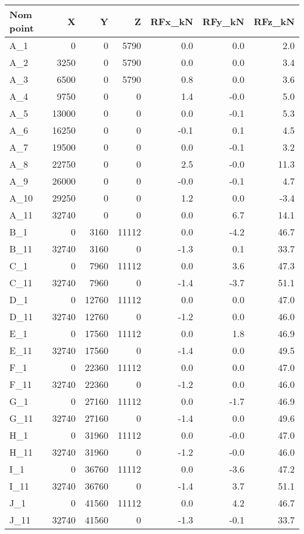 \begin{tabular}{lrrrrrr}
\toprule
Nom point & X & Y & Z & RFx\_kN & RFy\_kN & RFz\_kN \\
\midrule
A\_1 & 0 & 0 & 5790 & 0.0 & 0.0 & 2.0 \\
A\_2 & 3250 & 0 & 5790 & 0.0 & 0.0 & 3.4 \\
A\_3 & 6500 & 0 & 5790 & 0.8 & 0.0 & 3.6 \\
A\_4 & 9750 & 0 & 0 & 1.4 & -0.0 & 5.0 \\
A\_5 & 13000 & 0 & 0 & 0.0 & -0.1 & 5.3 \\
A\_6 & 16250 & 0 & 0 & -0.1 & 0.1 & 4.5 \\
A\_7 & 19500 & 0 & 0 & 0.0 & -0.1 & 3.2 \\
A\_8 & 22750 & 0 & 0 & 2.5 & -0.0 & 11.3 \\
A\_9 & 26000 & 0 & 0 & -0.0 & -0.1 & 4.7 \\
A\_10 & 29250 & 0 & 0 & 1.2 & 0.0 & -3.4 \\
A\_11 & 32740 & 0 & 0 & 0.0 & 6.7 & 14.1 \\
B\_1 & 0 & 3160 & 11112 & 0.0 & -4.2 & 46.7 \\
B\_11 & 32740 & 3160 & 0 & -1.3 & 0.1 & 33.7 \\
C\_1 & 0 & 7960 & 11112 & 0.0 & 3.6 & 47.3 \\
C\_11 & 32740 & 7960 & 0 & -1.4 & -3.7 & 51.1 \\
D\_1 & 0 & 12760 & 11112 & 0.0 & 0.0 & 47.0 \\
D\_11 & 32740 & 12760 & 0 & -1.2 & 0.0 & 46.0 \\
E\_1 & 0 & 17560 & 11112 & 0.0 & 1.8 & 46.9 \\
E\_11 & 32740 & 17560 & 0 & -1.4 & 0.0 & 49.5 \\
F\_1 & 0 & 22360 & 11112 & 0.0 & 0.0 & 47.0 \\
F\_11 & 32740 & 22360 & 0 & -1.2 & 0.0 & 46.0 \\
G\_1 & 0 & 27160 & 11112 & 0.0 & -1.7 & 46.9 \\
G\_11 & 32740 & 27160 & 0 & -1.4 & 0.0 & 49.6 \\
H\_1 & 0 & 31960 & 11112 & 0.0 & -0.0 & 47.0 \\
H\_11 & 32740 & 31960 & 0 & -1.2 & -0.0 & 46.0 \\
I\_1 & 0 & 36760 & 11112 & 0.0 & -3.6 & 47.2 \\
I\_11 & 32740 & 36760 & 0 & -1.4 & 3.7 & 51.1 \\
J\_1 & 0 & 41560 & 11112 & 0.0 & 4.2 & 46.7 \\
J\_11 & 32740 & 41560 & 0 & -1.3 & -0.1 & 33.7 \\

\end{tabular}
